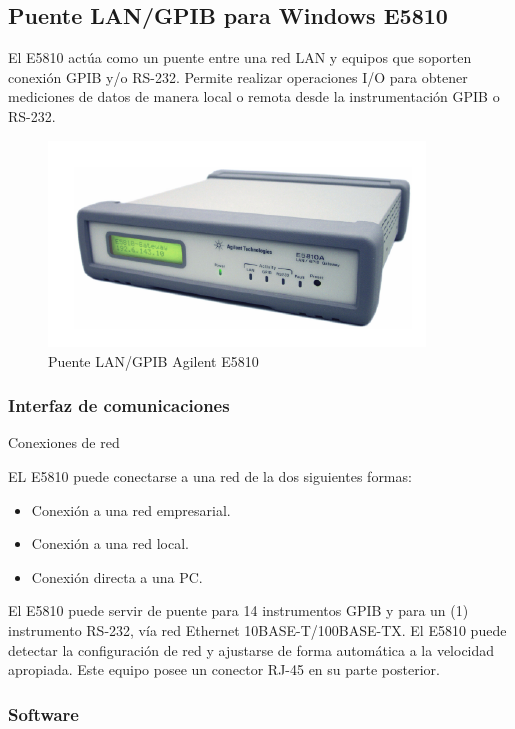 \subsection{Puente LAN/GPIB para Windows E5810}

El E5810 actúa como un puente entre una red LAN y equipos que soporten conexión GPIB y/o RS-232.  Permite   realizar operaciones I/O para obtener mediciones de datos de manera local o remota desde la instrumentación GPIB o RS-232.

\begin{figure}[h!] 
	\centering
	\includegraphics[width=10cm]{Imagenes/E5810.pdf}
	\caption{Puente LAN/GPIB Agilent E5810}
	\label{Fig:PuenteLanGPIB}
\end{figure}

\subsubsection{Interfaz de comunicaciones}
Conexiones de red

EL E5810 puede conectarse a una red de la dos siguientes formas: 

\begin{itemize}
	\item Conexión a una red empresarial.
	\item Conexión a una red local.
	\item Conexión directa a una PC.
\end{itemize}

El E5810 puede servir de puente para 14 instrumentos GPIB y para un (1) instrumento RS-232, vía red Ethernet  10BASE-T/100BASE-TX. El E5810 puede detectar la configuración de red y ajustarse de forma automática a la velocidad apropiada. Este equipo posee un conector RJ-45 en su parte posterior. 

\subsubsection{Software}

